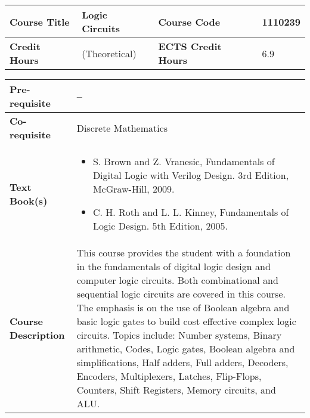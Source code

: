 \documentclass[12pt]{article}
\begin{document}
\bigskip
\bigskip



\begin{minipage}{\textwidth}
\begin{tabularx}{\textwidth}{|l|X|l|X|}
\hline
\textbf{Course Title}       &  Logic Circuits & \textbf{Course Code}       &  1110239 \\ \hline
\textbf{Credit Hours}       &   (Theoretical) & \textbf{ECTS Credit Hours}       &  6.9  \\ \hline
\end{tabularx}

\begin{tabularx}{\textwidth}{|l|X|}
\hline
\textbf{Pre-requisite}      &  -- \\ \hline
\textbf{Co-requisite}       &  Discrete Mathematics \\ \hline
\textbf{Text Book(s)}      & \begin{minipage}{.70\textwidth}
					\begin{itemize} \itemsep-0.4em
						\vspace{3mm}
						\item S. Brown and Z. Vranesic, Fundamentals of Digital Logic with Verilog Design. 3rd Edition, McGraw-Hill, 2009.
						\item C. H. Roth and L. L. Kinney, Fundamentals of Logic Design. 5th Edition, 2005.
						\vspace{3mm}
					\end{itemize}
				\end{minipage}  \\ \hline
\textbf{Course Description} & \begin{minipage}{.70\textwidth}
					\vspace{3mm}
					This course provides the student with a foundation in the fundamentals of digital logic design and
					computer logic circuits. Both combinational and sequential logic circuits are covered in this course. The
					emphasis is on the use of Boolean algebra and basic logic gates to build cost effective complex logic
					circuits. Topics include: Number systems, Binary arithmetic, Codes, Logic gates, Boolean algebra and
					simplifications, Half adders, Full adders, Decoders, Encoders, Multiplexers, Latches, Flip-Flops,
					Counters, Shift Registers, Memory circuits, and ALU.

					\vspace{3mm}
					\end{minipage} \\ \hline
\end{tabularx}
\end{minipage}
\end{document}
